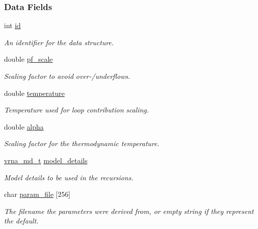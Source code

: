 \subsubsection*{Data Fields}
\begin{DoxyCompactItemize}
\item 
int \mbox{\hyperlink{group__energy__parameters_a378d5bcf2bae1f3ec84c912c7d3908d2}{id}}
\begin{DoxyCompactList}\small\item\em An identifier for the data structure. \end{DoxyCompactList}\item 
\mbox{\label{group__energy__parameters_a53c12f0d74f94ce371e0471a8ab5a377}} 
double \mbox{\hyperlink{group__energy__parameters_a53c12f0d74f94ce371e0471a8ab5a377}{pf\+\_\+scale}}
\begin{DoxyCompactList}\small\item\em Scaling factor to avoid over-\//underflows. \end{DoxyCompactList}\item 
\mbox{\label{group__energy__parameters_a674656d65ea957ddbeff8bd146b7fc16}} 
double \mbox{\hyperlink{group__energy__parameters_a674656d65ea957ddbeff8bd146b7fc16}{temperature}}
\begin{DoxyCompactList}\small\item\em Temperature used for loop contribution scaling. \end{DoxyCompactList}\item 
double \mbox{\hyperlink{group__energy__parameters_a77145830b7bb01b36c3217b363310ef0}{alpha}}
\begin{DoxyCompactList}\small\item\em Scaling factor for the thermodynamic temperature. \end{DoxyCompactList}\item 
\mbox{\label{group__energy__parameters_ac18055127bccc27c1223f1d2f3b01b53}} 
\mbox{\hyperlink{group__model__details_ga1f8a10e12a0a1915f2a4eff0b28ea17c}{vrna\+\_\+md\+\_\+t}} \mbox{\hyperlink{group__energy__parameters_ac18055127bccc27c1223f1d2f3b01b53}{model\+\_\+details}}
\begin{DoxyCompactList}\small\item\em Model details to be used in the recursions. \end{DoxyCompactList}\item 
\mbox{\label{group__energy__parameters_a8e1b02a4753a9b64c3c9ae8529b9d75c}} 
char \mbox{\hyperlink{group__energy__parameters_a8e1b02a4753a9b64c3c9ae8529b9d75c}{param\+\_\+file}} \mbox{[}256\mbox{]}
\begin{DoxyCompactList}\small\item\em The filename the parameters were derived from, or empty string if they represent the default. \end{DoxyCompactList}\end{DoxyCompactItemize}


